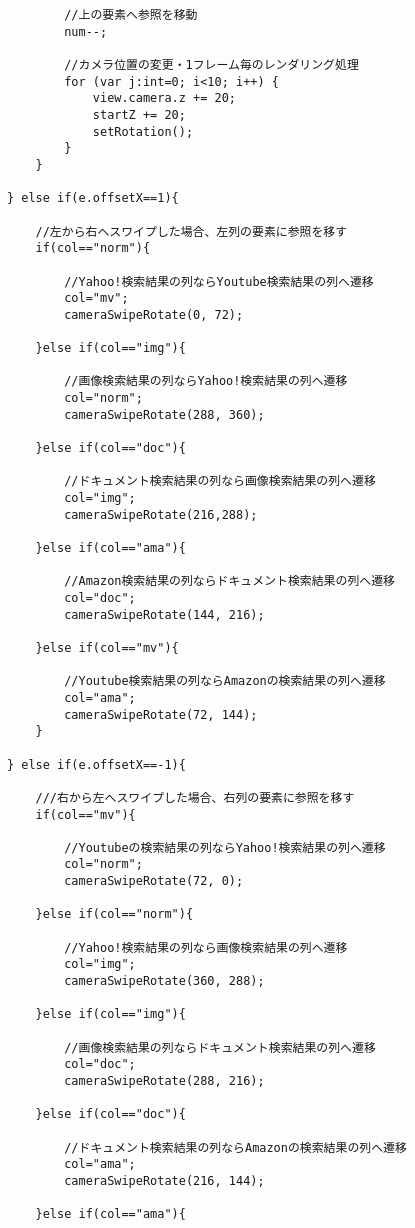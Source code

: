 {\begin{verbatim}
					//上の要素へ参照を移動
					num--;
					
					//カメラ位置の変更・1フレーム毎のレンダリング処理
					for (var j:int=0; i<10; i++) {
						view.camera.z += 20;
						startZ += 20;
						setRotation();
					}
				}
				
			} else if(e.offsetX==1){
				
				//左から右へスワイプした場合、左列の要素に参照を移す
				if(col=="norm"){
					
					//Yahoo!検索結果の列ならYoutube検索結果の列へ遷移
					col="mv";
					cameraSwipeRotate(0, 72);
				
				}else if(col=="img"){
					
					//画像検索結果の列ならYahoo!検索結果の列へ遷移
					col="norm";
					cameraSwipeRotate(288, 360);
				
				}else if(col=="doc"){
					
					//ドキュメント検索結果の列なら画像検索結果の列へ遷移
					col="img";
					cameraSwipeRotate(216,288);
					
				}else if(col=="ama"){
					
					//Amazon検索結果の列ならドキュメント検索結果の列へ遷移
					col="doc";
					cameraSwipeRotate(144, 216);
				
				}else if(col=="mv"){
					
					//Youtube検索結果の列ならAmazonの検索結果の列へ遷移
					col="ama";
					cameraSwipeRotate(72, 144);
				}
				
			} else if(e.offsetX==-1){
				
				///右から左へスワイプした場合、右列の要素に参照を移す
				if(col=="mv"){
					
					//Youtubeの検索結果の列ならYahoo!検索結果の列へ遷移
					col="norm";
					cameraSwipeRotate(72, 0);
				
				}else if(col=="norm"){
					
					//Yahoo!検索結果の列なら画像検索結果の列へ遷移
					col="img";
					cameraSwipeRotate(360, 288);
				
				}else if(col=="img"){
					
					//画像検索結果の列ならドキュメント検索結果の列へ遷移
					col="doc";
					cameraSwipeRotate(288, 216);
				
				}else if(col=="doc"){
					
					//ドキュメント検索結果の列ならAmazonの検索結果の列へ遷移
					col="ama";
					cameraSwipeRotate(216, 144);
				
				}else if(col=="ama"){
					

\end{verbatim}}

